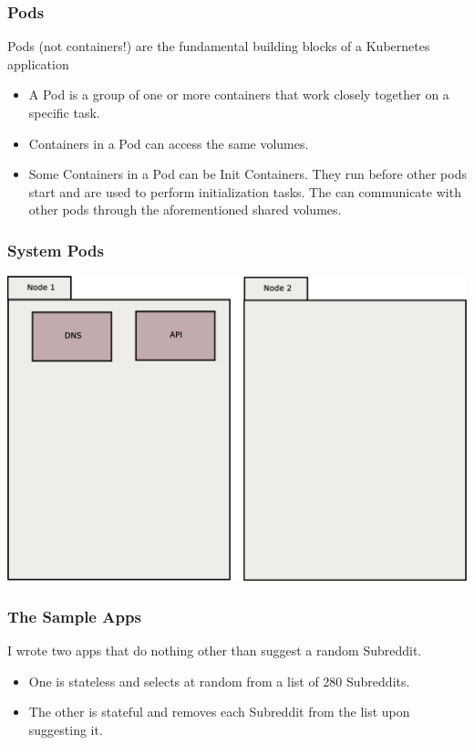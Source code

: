 \documentclass{beamer}
\begin{document}
\begin{frame}
\frametitle{Pods}
Pods (not containers!) are the fundamental building blocks of a Kubernetes application
\begin{itemize}
    \item A Pod is a group of one or more containers that work closely together on a specific task.
    \item Containers in a Pod can access the same volumes.
    \item Some Containers in a Pod can be Init Containers. They run before other pods start and are used to perform initialization tasks. The can communicate with other pods through the aforementioned shared volumes.
\end{itemize}
\end{frame}

\begin{frame}
    \frametitle{System Pods}
    \includegraphics[width=\textwidth,height=0.85\textheight,keepaspectratio]{graphics/01-systemPods.eps}
\end{frame}

\begin{frame}
\frametitle{The Sample Apps}
I wrote two apps that do nothing other than suggest a random Subreddit.
\begin{itemize}
    \item One is stateless and selects at random from a list of 280 Subreddits.
    \item The other is stateful and removes each Subreddit from the list upon suggesting it.
\end{itemize}
\end{frame}
\end{document}
